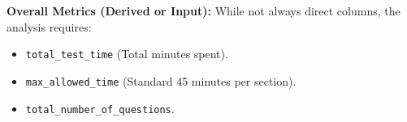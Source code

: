 \documentclass{article}
\begin{document}
\textbf{Overall Metrics (Derived or Input):}
While not always direct columns, the analysis requires:
\begin{itemize}
    \item \texttt{total\_test\_time} (Total minutes spent).
    \item \texttt{max\_allowed\_time} (Standard 45 minutes per section).
    \item \texttt{total\_number\_of\_questions}.
\end{itemize}

\end{document}
